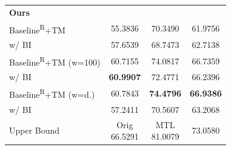 \begin{table}[hp]
\begin{tabular}{l|c|c|c}
\midrule
\rowcolor{gray!40}
\textcolor{red!80!black}{\textbf{Ours}}& & &\\
Baseline\textsuperscript{R}+TM & 55.3836 &70.3490 & 61.9756 \\
\rowcolor{gray!10}\quad w/ BI & 57.6539& 68.7473&  62.7138\\


Baseline\textsuperscript{R}+TM (w=100) &
60.7155 & 74.0817 & 66.7359 \\
\rowcolor{gray!10}\quad w/ BI &
\textbf{60.9907}&72.4771&  66.2396\\

Baseline\textsuperscript{R}+TM (w=d.) &
60.7843 & \textbf{74.4796} & \textbf{66.9386} \\
\rowcolor{gray!10}\quad w/ BI &
57.2411 & 70.5607 & 63.2068 \\

\midrule
  
Upper Bound &
\makecell{Orig\\ 66.5291} & \makecell{MTL\\ 81.0079} & 73.0580\\

\bottomrule
\end{tabular}

\end{table}
